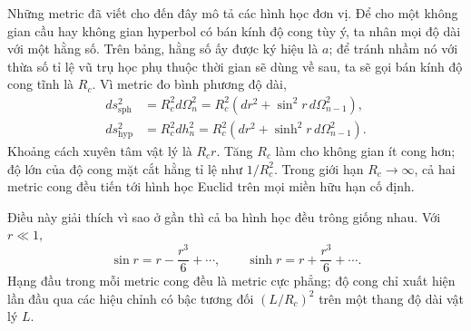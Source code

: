 Những metric đã viết cho đến đây mô tả các hình học đơn vị. Để cho một không gian cầu hay không gian hyperbol có bán kính độ cong tùy ý, ta nhân mọi độ dài với một hằng số. Trên bảng, hằng số ấy được ký hiệu là \(a\); để tránh nhầm nó với thừa số tỉ lệ vũ trụ học phụ thuộc thời gian sẽ dùng về sau, ta sẽ gọi bán kính độ cong tĩnh là \(R_c\). Vì metric đo bình phương độ dài,
\begin{align}
ds_{\mathrm{sph}}^2
  &=R_c^2d\Omega_n^2
   =R_c^2\left(dr^2+\sin^2r\,d\Omega_{n-1}^2\right),\\
ds_{\mathrm{hyp}}^2
  &=R_c^2dh_n^2
   =R_c^2\left(dr^2+\sinh^2r\,d\Omega_{n-1}^2\right).
\label{eq:c03-scaled-curvature}
\end{align}
Khoảng cách xuyên tâm vật lý là \(R_cr\). Tăng \(R_c\) làm cho không gian ít cong hơn; độ lớn của độ cong mặt cắt hằng tỉ lệ như \(1/R_c^2\). Trong giới hạn \(R_c\to\infty\), cả hai metric cong đều tiến tới hình học Euclid trên mọi miền hữu hạn cố định.

\begin{classroomqa}
\end{classroomqa}

Điều này giải thích vì sao ở gần thì cả ba hình học đều trông giống nhau. Với \(r\ll1\),
\begin{equation}
\sin r=r-\frac{r^3}{6}+\cdots,
\qquad
\sinh r=r+\frac{r^3}{6}+\cdots.
\end{equation}
Hạng đầu trong mỗi metric cong đều là metric cực phẳng; độ cong chỉ xuất hiện lần đầu qua các hiệu chỉnh có bậc tương đối \((L/R_c)^2\) trên một thang độ dài vật lý \(L\).

\begin{classroomqa}
\end{classroomqa}

